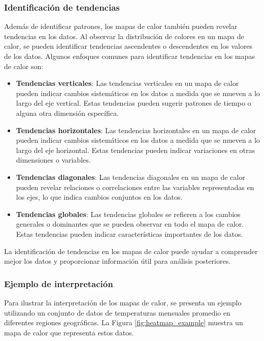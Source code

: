 \documentclass{article}
\begin{document}
\subsubsection{Identificación de tendencias}
Además de identificar patrones, los mapas de calor también pueden revelar tendencias en los datos. Al observar la distribución de colores en un mapa de calor, se pueden identificar tendencias ascendentes o descendentes en los valores de los datos. Algunos enfoques comunes para identificar tendencias en los mapas de calor son:

\begin{itemize}
  \item \textbf{Tendencias verticales}: Las tendencias verticales en un mapa de calor pueden indicar cambios sistemáticos en los datos a medida que se mueven a lo largo del eje vertical. Estas tendencias pueden sugerir patrones de tiempo o alguna otra dimensión específica.
  \item \textbf{Tendencias horizontales}: Las tendencias horizontales en un mapa de calor pueden indicar cambios sistemáticos en los datos a medida que se mueven a lo largo del eje horizontal. Estas tendencias pueden indicar variaciones en otras dimensiones o variables.
  \item \textbf{Tendencias diagonales}: Las tendencias diagonales en un mapa de calor pueden revelar relaciones o correlaciones entre las variables representadas en los ejes, lo que indica cambios conjuntos en los datos.
  \item \textbf{Tendencias globales}: Las tendencias globales se refieren a los cambios generales o dominantes que se pueden observar en todo el mapa de calor. Estas tendencias pueden indicar características importantes de los datos.
\end{itemize}

La identificación de tendencias en los mapas de calor puede ayudar a comprender mejor los datos y proporcionar información útil para análisis posteriores.

\subsubsection{Ejemplo de interpretación}
Para ilustrar la interpretación de los mapas de calor, se presenta un ejemplo utilizando un conjunto de datos de temperaturas mensuales promedio en diferentes regiones geográficas. La Figura \ref{fig:heatmap_example} muestra un mapa de calor que representa estos datos.
\end{document}
